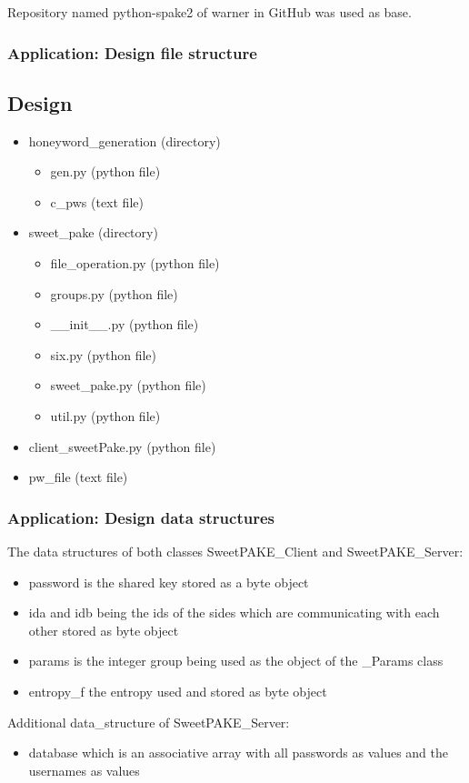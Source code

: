 \documentclass[9pt]{beamer}
\begin{document}
\begin{frame}
Repository named python-spake2 of warner in GitHub was used as base. 
\frametitle{Application: Design file structure}
\subsection{Design}

\begin{itemize}
	\item honeyword\_generation (directory)
	\begin{itemize}
		\item gen.py (python file)
		\item c\_pws (text file)
	\end{itemize}

	\item sweet\_pake (directory)
	\begin{itemize}
		\item file\_operation.py (python file)
		\item groups.py (python file)
		\item \_\_init\_\_.py (python file)
		\item six.py (python file)
		\item sweet\_pake.py (python file)
		\item util.py (python file)
	\end{itemize}
	\item client\_sweetPake.py (python file)
	\item pw\_file (text file)
\end{itemize}
\end{frame}

\begin{frame}
\frametitle{Application: Design data structures}
The data structures of both classes SweetPAKE\_Client and SweetPAKE\_Server:
\begin{itemize}
	\item password is the shared key stored as a byte object 
	\item ida and idb being the ids of the sides which are communicating
		with each other stored as byte object
	\item params is the integer group being used as the object of the \_Params class
	\item entropy\_f the entropy used and stored as byte object
\end{itemize}

Additional data\_structure of SweetPAKE\_Server:
\begin{itemize} 
 	\item database which is an associative array with all passwords as
			values and the usernames as values
\end{itemize}

\end{frame}
\end{document}
